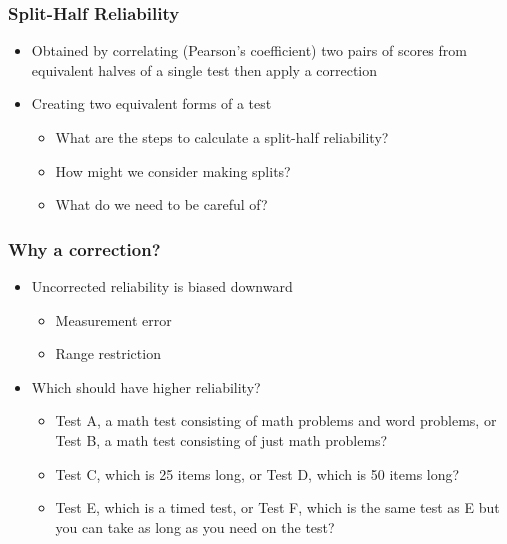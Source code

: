 \documentclass[dvipsnames]{beamer}\usepackage[]{graphicx}\usepackage[]{color}
\begin{document}
\begin{frame}
  \frametitle{Split-Half Reliability}
  \begin{itemize}
    \item Obtained by correlating (Pearson's coefficient) two pairs of scores from equivalent halves of a single test then apply a correction
    \item Creating two equivalent forms of a test
    \begin{itemize}
    \item \textcolor{wapurple}{What are the steps to calculate a split-half reliability?}
    \item \textcolor{wapurple}{How might we consider making splits?}
    \item \textcolor{wapurple}{What do we need to be careful of?}
    \end{itemize}
  \end{itemize}
\end{frame}

\begin{frame}
  \frametitle{Why a correction?}
  \begin{itemize}
    \item<1-> \textcolor{wared}{Uncorrected reliability is biased downward}
    \begin{itemize}
      \item<2-> Measurement error
      \item<2-> Range restriction
    \end{itemize}
    \item<3-> \textcolor{wared}{Which should have higher reliability?}
      \begin{itemize}
        \item Test A, a math test consisting of math problems and word problems, or Test B, a math test consisting of just math problems?
        \item Test C, which is 25 items long, or Test D, which is 50 items long?
        \item Test E, which is a timed test, or Test F, which is the same test as E but you can take as long as you need on the test?
      \end{itemize}
    \end{itemize}
\end{frame}
\end{document}
